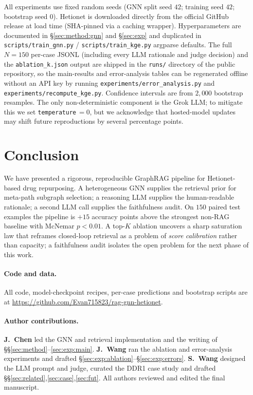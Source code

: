 \documentclass{article}
\begin{document}
All experiments use fixed random seeds (GNN split seed $42$; training seed $42$; bootstrap seed $0$). Hetionet is downloaded directly from the official GitHub release at load time (SHA-pinned via a caching wrapper). Hyperparameters are documented in \S\ref{sec:method:gnn} and \S\ref{sec:exp} and duplicated in \texttt{scripts/train\_gnn.py} / \texttt{scripts/train\_kge.py} argparse defaults. The full $N{=}150$ per-case JSONL (including every LLM rationale and judge decision) and the \texttt{ablation\_k.json} output are shipped in the \texttt{runs/} directory of the public repository, so the main-results and error-analysis tables can be regenerated offline without an API key by running \texttt{experiments/error\_analysis.py} and \texttt{experiments/recompute\_kge.py}. Confidence intervals are from $2{,}000$ bootstrap resamples. The only non-deterministic component is the Grok LLM; to mitigate this we set \texttt{temperature}\,$=0$, but we acknowledge that hosted-model updates may shift future reproductions by several percentage points.

\section{Conclusion}
\label{sec:conclusion}
We have presented a rigorous, reproducible GraphRAG pipeline for Hetionet-based drug repurposing. A heterogeneous GNN supplies the retrieval prior for meta-path subgraph selection; a reasoning LLM supplies the human-readable rationale; a second LLM call supplies the faithfulness audit. On $150$ paired test examples the pipeline is $+15$ accuracy points above the strongest non-RAG baseline with McNemar $p{<}0.01$. A top-$K$ ablation uncovers a sharp saturation law that reframes closed-loop retrieval as a problem of \emph{score calibration} rather than capacity; a faithfulness audit isolates the open problem for the next phase of this work.

\paragraph{Code and data.}
All code, model-checkpoint recipes, per-case predictions and bootstrap scripts are at \url{https://github.com/Evan715823/rag-gnn-hetionet}.

\paragraph{Author contributions.}
\textbf{J.\ Chen} led the GNN and retrieval implementation and the writing of \S\S\ref{sec:method}--\ref{sec:exp:main}. \textbf{J.\ Wang} ran the ablation and error-analysis experiments and drafted \S\ref{sec:exp:ablation}--\S\ref{sec:exp:errors}. \textbf{S.\ Wang} designed the LLM prompt and judge, curated the DDR1 case study and drafted \S\S\ref{sec:related},\ref{sec:case},\ref{sec:fut}. All authors reviewed and edited the final manuscript.


\end{document}
